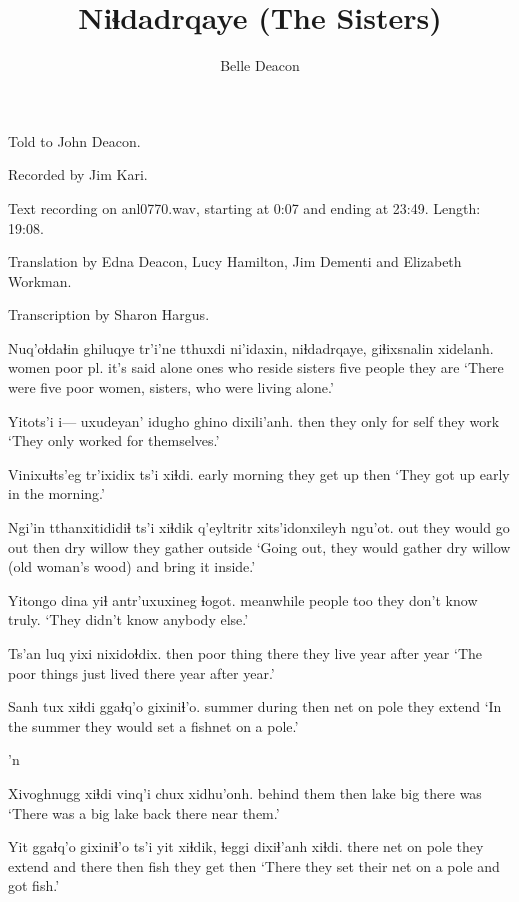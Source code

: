 \documentclass[12pt]{article}
\begin{document}
\title{Niɬdadrqaye (The Sisters)}
\author{Belle Deacon}
\date{}
\maketitle

Told to John Deacon. 

Recorded by Jim Kari. 

Text recording on anl0770.wav, starting at 0:07 and ending at 23:49. Length: 19:08.

Translation by Edna Deacon, Lucy Hamilton, Jim Dementi and Elizabeth Workman.    

Transcription by Sharon Hargus. 

\gll Nuq'oɬdaɬin ghiluqye tr'i'ne tthuxdi ni'idaxin, niɬdadrqaye, giɬixsnalin   xidelanh.  
women      {poor pl.}  {it's said}      alone    {ones who reside} sisters {five people} {they are}
\glt `There were five poor women, sisters, who were living alone.'
\glend

\gll Yitots'i i---  uxudeyan' idugho   {ghino dixili'anh}. 
then    {}       {they only}    {for self} {they work}
\glt `They only worked for themselves.'
\glend

\gll Vinixuɬts'eg   tr'ixidix   ts'i xiɬdi. 
{early morning} {they get up} {} then
\glt `They got up early in the morning.'
\glend

\gll Ngi'in tthanxitididiɬ ts'i xiɬdik q'eyltritr       xits'idonxileyh   ngu'ot.
out    {they would go out}  {}  then     {dry willow}  {they gather} outside 
\glt `Going out, they would gather dry willow (old woman's wood) and bring it inside.'
\glend

\gll Yitongo dina yiɬ antr'uxuxineg ɬogot.
meanwhile    people too {they don't know} truly.
\glt `They didn't know anybody else.'
\glend

\gll Ts'an luq  yixi nixidoɬdix.
then  {poor thing} there {they live year after year}
\glt `The poor things just lived there year after year.'
\glend

\gll Sanh tux xiɬdi ggaɬq'o gixiniɬ'o. 
summer during then {net on pole} {they extend}
\glt `In the summer they would set a fishnet on a pole.'
\glend

'n

\gll Xivoghnugg xiɬdi vinq'i chux xidhu'onh. 
{behind them} then lake big {there was}
\glt `There was a big lake back there near them.'
\glend

\gll Yit ggaɬq'o gixiniɬ'o ts'i yit xiɬdik, ɬeggi dixiɬ'anh xiɬdi. 
there {net on pole} {they extend} and there then fish {they get} then
\glt `There they set their net on a pole and got fish.'
\glend
\end{document}
